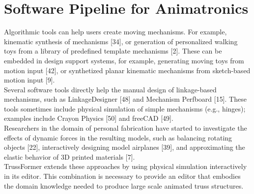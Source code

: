 \section{Software Pipeline for Animatronics}
Algorithmic tools can help users create moving mechanisms. For example, kinematic synthesis of mechanisms [34], or generation of personalized walking toys from a library of predefined template mechanisms [2]. These can be embedded in design support systems, for example, generating moving toys from motion input [42], or synthetized planar kinematic mechanisms from sketch-based motion input [9].\\
Several software tools directly help the manual design of linkage-based mechanisms, such as LinkageDesigner [48] and Mechanism Perfboard [15]. These tools sometimes include physical simulation of simple mechanisms (e.g., hinges); examples include Crayon Physics [50] and freeCAD [49].\\
Researchers in the domain of personal fabrication have started to investigate the effects of dynamic forces in the resulting models, such as balancing rotating objects [22], interactively designing model airplanes [39], and approximating the elastic behavior of 3D printed materials [7].\\
TrussFormer extends these approaches by using physical simulation interactively in its editor. This combination is necessary to provide an editor that embodies the domain knowledge needed to produce large scale animated truss structures.
